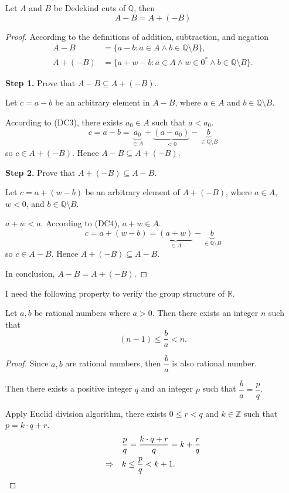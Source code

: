 \begin{theorem}\label{theorem:chapter1:negation-and-subtraction}
    Let $A$ and $B$ be Dedekind cuts of $\mathbb{Q}$, then
    \[
        A - B = A + (-B)
    \]
\end{theorem}

\begin{proof}
    According to the definitions of addition, subtraction, and negation
    \begin{align*}
        A - B    & = \{ a - b : a\in A\land b\in\mathbb{Q}\setminus B \},                      \\
        A + (-B) & = \{ a + w - b : a\in A\land w\in{0}^{*}\land b\in\mathbb{Q}\setminus B \}.
    \end{align*}

    \textbf{Step 1.} Prove that $A - B\subseteq A + (-B)$.

    Let $c = a - b$ be an arbitrary element in $A - B$, where $a\in A$ and $b\in\mathbb{Q}\setminus B$.

    According to (DC3), there exists $a_{0}\in A$ such that $a < a_{0}$.
    \[
        c = a - b = \underbrace{a_{0}}_{\in A} + \underbrace{(a - a_{0})}_{< 0} - \underbrace{b}_{\in\mathbb{Q}\setminus B}
    \]
    so $c\in A + (-B)$. Hence $A - B\subseteq A + (-B)$.
    \bigskip

    \textbf{Step 2.} Prove that $A + (-B)\subseteq A - B$.

    Let $c = a + (w - b)$ be an arbitrary element of $A + (-B)$, where $a\in A$, $w < 0$, and $b\in\mathbb{Q}\setminus B$.

    $a + w < a$. According to (DC4), $a + w\in A$.
    \[
        c = a + (w - b) = \underbrace{(a + w)}_{\in A} - \underbrace{b}_{\in\mathbb{Q}\setminus B}
    \]
    so $c\in A - B$. Hence $A + (-B)\subseteq A - B$.
    \bigskip

    In conclusion, $A - B = A + (-B)$.
\end{proof}

I need the following property to verify the group structure of $\mathbb{R}$.

\begin{lemma}
    Let $a, b$ be rational numbers where $a > 0$. Then there exists an integer $n$ such that
    \[
        (n - 1)\le \frac{b}{a} < n.
    \]
\end{lemma}

\begin{proof}
    Since $a, b$ are rational numbers, then $\dfrac{b}{a}$ is also rational number.

    Then there exists a positive integer $q$ and an integer $p$ such that $\dfrac{b}{a} = \dfrac{p}{q}$.

    Apply Euclid division algorithm, there exists $0\le r < q$ and $k\in\mathbb{Z}$ such that $p = k\cdot q + r$.
    \begin{align*}
                         & \frac{p}{q} = \frac{k\cdot q + r}{q} = k + \frac{r}{q} \\
        \Rightarrow\quad & k \le \frac{p}{q} < k + 1.\qedhere
    \end{align*}
\end{proof}

